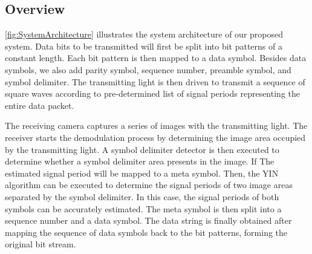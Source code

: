 \subsection{Overview}

\autoref{fig:SystemArchitecture} illustrates the system architecture of our proposed system.
Data bits to be transmitted will first be split into bit patterns of a constant length. Each bit pattern is then mapped to a data symbol. Besides data symbols, we also add parity symbol, sequence number, preamble symbol, and symbol delimiter. The transmitting light is then driven to transmit a sequence of square waves according to pre-determined list of signal periods representing the entire data packet. 

The receiving camera captures a series of images with the transmitting light. The receiver starts the demodulation process by determining the image area occupied by the transmitting light. A symbol delimiter detector is then executed to determine whether a symbol delimiter area presents in the image. If The estimated signal period will be mapped to a meta symbol. Then, the YIN algorithm can be executed to determine the signal periods of two image areas separated by the symbol delimiter. In this case, the signal periods of both symbols can be accurately estimated. The meta symbol is then split into a sequence number and a data symbol. The data string is finally obtained after mapping the sequence of data symbols back to the bit patterns, forming the original bit stream. 